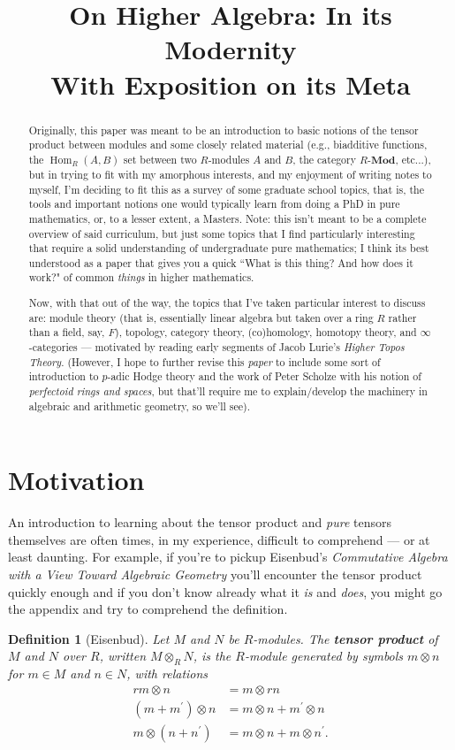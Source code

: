 \documentclass[12pt,reqno]{amsart}
\title{On Higher Algebra: In its Modernity \\ With Exposition on its Meta}
\theoremstyle{plain}
\newtheorem{defi}{Definition}
\DeclareMathOperator{\Hom}{Hom}
\begin{document}
\begin{abstract}
Originally, this paper was meant to be an introduction to basic notions of the tensor product between modules and some closely related material (e.g., biadditive functions, the $\Hom_R (A, B)$ set between two $R$-modules $A$ and $B$,  the category $R$-$\mathbf{Mod}$, etc...), but in trying to fit with my amorphous interests,  and my enjoyment of writing notes to myself, I'm deciding to fit this as a survey of some graduate school topics, that is, the tools and important notions one would typically learn from doing a PhD in pure mathematics, or, to a lesser extent, a Masters. Note: this isn't meant to be a complete overview of said curriculum, but just some topics that I find particularly interesting that require a solid understanding of undergraduate pure mathematics; I think its best understood as a paper that gives you a quick ``What is this thing? And how does it work?" of common \textit{things} in higher mathematics. 

Now, with that out of the way, the topics that I've taken particular interest to discuss are: module theory (that is, essentially linear algebra but taken over a ring $R$ rather than a field, say, $F$), topology, category theory,  (co)homology, homotopy theory, and $\infty$-categories — motivated by reading early segments of Jacob Lurie's \textit{Higher Topos Theory}.  (However, I hope to further revise this \textit{paper} to include some sort of introduction to $p$-adic Hodge theory and the work of Peter Scholze with his notion of \textit{perfectoid rings and spaces}, but that'll require me to explain/develop the machinery in algebraic and arithmetic geometry, so we'll see). 
\end{abstract}
\maketitle
\newpage
\tableofcontents
\newpage
\section{Motivation}

An introduction to learning about the tensor product and \textit{pure} tensors themselves are often times, in my experience, difficult to comprehend — or at least daunting. For example, if you're to pickup Eisenbud's \textit{Commutative Algebra with a View Toward Algebraic Geometry} you'll encounter the tensor product quickly enough and if you don't know already what it \textit{is} and \textit{does}, you might go the appendix and try to comprehend the definition. 
\begin{defi}[Eisenbud] Let $M$ and $N$ be $R$-modules. The \textbf{tensor product} of $M$ and $N$ over $R$, written $M \otimes_R N$, is the $R$-module generated by symbols $m \otimes n$ for $m \in M$ and $n \in N$, with relations 
\begin{align*}
rm \otimes n &= m \otimes rn \\
(m + m^{\prime}) \otimes n &= m \otimes n + m^{\prime} \otimes n  \\
m \otimes (n + n^{\prime}) &= m \otimes n + m \otimes n^{\prime}.
\end{align*}
\end{defi} 
\end{document}

